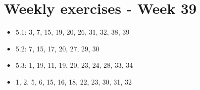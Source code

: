 \section*{Weekly exercises - Week 39}
\begin{itemize}
  \item 5.1: 3, 7, 15, 19, 20, 26, 31, 32, 38, 39
  \item 5.2: 7, 15, 17, 20, 27, 29, 30
  \item 5.3: 1, 19, 11, 19, 20, 23, 24, 28, 33, 34
  \item 1, 2, 5, 6, 15, 16, 18, 22, 23, 30, 31, 32
\end{itemize}

